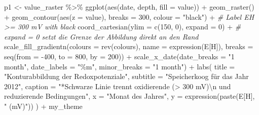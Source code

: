\documentclass[
]{article}
\newenvironment{Shaded}{\begin{snugshade}}{\end{snugshade}}
\newcommand{\AttributeTok}[1]{\textcolor[rgb]{0.77,0.63,0.00}{#1}}
\newcommand{\CommentTok}[1]{\textcolor[rgb]{0.56,0.35,0.01}{\textit{#1}}}
\newcommand{\DecValTok}[1]{\textcolor[rgb]{0.00,0.00,0.81}{#1}}
\newcommand{\FunctionTok}[1]{\textcolor[rgb]{0.00,0.00,0.00}{#1}}
\newcommand{\NormalTok}[1]{#1}
\newcommand{\OtherTok}[1]{\textcolor[rgb]{0.56,0.35,0.01}{#1}}
\newcommand{\SpecialCharTok}[1]{\textcolor[rgb]{0.00,0.00,0.00}{#1}}
\newcommand{\StringTok}[1]{\textcolor[rgb]{0.31,0.60,0.02}{#1}}
\begin{document}
\begin{Shaded}
\begin{Highlighting}[]
\NormalTok{p1 }\OtherTok{\textless{}{-}}\NormalTok{ value\_raster }\SpecialCharTok{\%\textgreater{}\%}
  \FunctionTok{ggplot}\NormalTok{(}\FunctionTok{aes}\NormalTok{(date, depth, }\AttributeTok{fill =}\NormalTok{ value)) }\SpecialCharTok{+}
  \FunctionTok{geom\_raster}\NormalTok{() }\SpecialCharTok{+}
  \FunctionTok{geom\_contour}\NormalTok{(}\FunctionTok{aes}\NormalTok{(}\AttributeTok{z =}\NormalTok{ value), }\AttributeTok{breaks =} \DecValTok{300}\NormalTok{, }\AttributeTok{colour =} \StringTok{"black"}\NormalTok{) }\SpecialCharTok{+} \CommentTok{\# Label EH \textgreater{}= 300 mV with black}
  \FunctionTok{coord\_cartesian}\NormalTok{(}\AttributeTok{ylim =} \FunctionTok{c}\NormalTok{(}\DecValTok{150}\NormalTok{, }\DecValTok{0}\NormalTok{), }\AttributeTok{expand =} \DecValTok{0}\NormalTok{) }\SpecialCharTok{+} \CommentTok{\# expand = 0 setzt die Grenze der Abbildung direkt an den Rand}
  \FunctionTok{scale\_fill\_gradientn}\NormalTok{(}\AttributeTok{colours =} \FunctionTok{rev}\NormalTok{(colours), }
                       \AttributeTok{name =} \FunctionTok{expression}\NormalTok{(E[H]),}
                       \AttributeTok{breaks =} \FunctionTok{seq}\NormalTok{(}\AttributeTok{from =} \SpecialCharTok{{-}}\DecValTok{400}\NormalTok{, }\AttributeTok{to =} \DecValTok{800}\NormalTok{, }\AttributeTok{by =} \DecValTok{200}\NormalTok{)) }\SpecialCharTok{+}
  \FunctionTok{scale\_x\_date}\NormalTok{(}\AttributeTok{date\_breaks =} \StringTok{"1 month"}\NormalTok{, }\AttributeTok{date\_labels =} \StringTok{"\%m"}\NormalTok{, }\AttributeTok{minor\_breaks =} \StringTok{"1 month"}\NormalTok{) }\SpecialCharTok{+}
  \FunctionTok{labs}\NormalTok{(}
    \AttributeTok{title =} \StringTok{"Konturabbildung der Redoxpotenziale"}\NormalTok{,}
    \AttributeTok{subtitle =} \StringTok{"Speicherkoog für das Jahr 2012"}\NormalTok{,}
    \AttributeTok{caption =} \StringTok{"*Schwarze Linie trennt oxidierende (\textgreater{} 300 mV)}\SpecialCharTok{\textbackslash{}n}\StringTok{ und reduzierende Bedingungen"}\NormalTok{,}
    \AttributeTok{x =} \StringTok{"Monat des Jahres"}\NormalTok{,}
    \AttributeTok{y =} \FunctionTok{expression}\NormalTok{(}\FunctionTok{paste}\NormalTok{(E[H], }\StringTok{" (mV)"}\NormalTok{))}
\NormalTok{  ) }\SpecialCharTok{+} 
\NormalTok{  my\_theme}


\end{Highlighting}
\end{Shaded}
\end{document}
